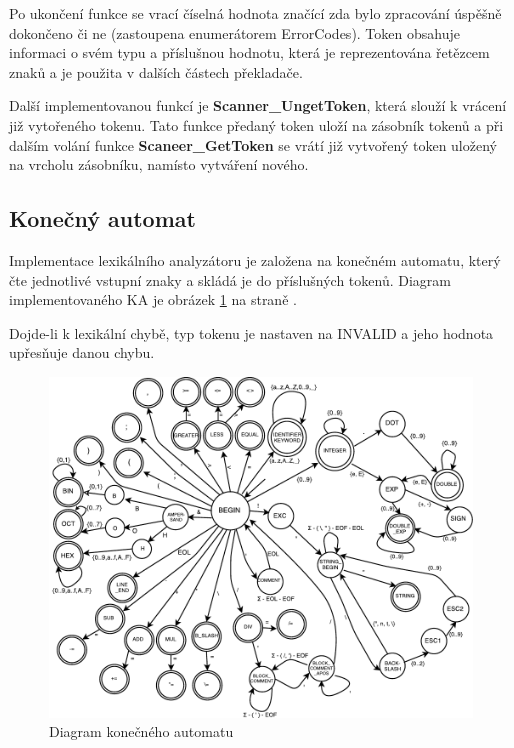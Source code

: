 \documentclass[a4paper,11pt]{article}
\begin{document}
\vspace{2mm}
Po ukončení funkce se vrací číselná hodnota značící zda bylo zpracování úspěšně dokončeno či ne (zastoupena enumerátorem \textsf{ErrorCodes}). Token obsahuje informaci o svém typu a příslušnou hodnotu, která je reprezentována řetězcem znaků a je použita v dalších částech překladače.

\vspace{2mm}
Další implementovanou funkcí je \textbf{Scanner\_UngetToken}, která slouží k vrácení již vytořeného tokenu. Tato funkce předaný token uloží na zásobník tokenů a při dalším volání funkce \textbf{Scaneer\_GetToken} se vrátí již vytvořený token uložený na vrcholu zásobníku, namísto vytváření nového.

\subsection{Konečný automat} \label{lex-fa}
Implementace lexikálního analyzátoru je založena na konečném automatu, který čte jednotlivé vstupní znaky a skládá je do příslušných tokenů. Diagram implementovaného KA je obrázek \ref{fig:automata} na straně \pageref{fig:automata}.

\vspace{2mm}
Dojde-li k lexikální chybě, typ tokenu je nastaven na \textsf{INVALID} a jeho hodnota upřesňuje danou chybu.

\begin{figure}[!htbp]
	\hspace*{-2cm}
	\includegraphics[width=17cm]{ka.pdf}
	\caption{Diagram konečného automatu}
	\label{fig:automata}
\end{figure}
\end{document}
